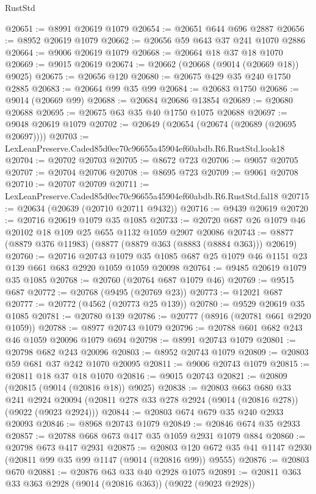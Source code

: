 \begin{lexlean}{RustStd}
\begin{coremodule}
@20651 := @8991 @20619 @1079
@20654 := @20651 @644 @696 @2887
@20656 := @8952 @20619 @1079
@20662 := @20656 @59 @643 @37 @241 @1070 @2886
@20664 := @9006 @20619 @1079
@20668 := @20664 @18 @37 @18 @1070
@20669 := @9015 @20619
@20674 := @20662 (@20668 (@9014 (@20669 @18)) @9025)
@20675 := @20656 @120
@20680 := @20675 @429 @35 @240 @1750 @2885
@20683 := @20664 @99 @35 @99
@20684 := @20683 @1750
@20686 := @9014 (@20669 @99)
@20688 := @20684 @20686 @13854
@20689 := @20680 @20688
@20695 := @20675 @63 @35 @40 @1750 @1075 @20688
@20697 := @9048 @20619 @1079
@20702 := @20649 (@20654 (@20674 (@20689 (@20695 @20697))))
@20703 := LexLeanPreserve.Caded85d0ec70c96655a45904ef60abdb.R6.RustStd.look18
@20704 := @20702 @20703
@20705 := @8672 @723
@20706 := @9057 @20705
@20707 := @20704 @20706
@20708 := @8695 @723
@20709 := @9061 @20708
@20710 := @20707 @20709
@20711 := LexLeanPreserve.Caded85d0ec70c96655a45904ef60abdb.R6.RustStd.fal18
@20715 := @20634 (@20639 (@20710 @20711 @9432))
@20716 := @9439 @20619
@20720 := @20716 @20619 @1079 @35 @1085
@20733 := @20720 @687 @26 @1079 @46 @20102 @18 @109 @25 @655 @1132 @1059 @2907 @20086
@20743 := @8877 (@8879 @376 @11983) (@8877 (@8879 @363 (@8883 (@8884 @363))) @20619)
@20760 := @20716
    @20743
    @1079
    @35
    @1085
    @687
    @25
    @1079
    @46
    @1151
    @23
    @139
    @661
    @683
    @2920
    @1059
    @1059
    @20098
@20764 := @9485 @20619 @1079 @35 @1085
@20768 := @20760 (@20764 @687 @1079 @46)
@20769 := @9515 @687
@20772 := @20768 (@9495 (@20769 @23))
@20773 := @12021 @687
@20777 := @20772 (@4562 (@20773 @25 @139))
@20780 := @9529 @20619 @35 @1085
@20781 := @20780 @139
@20786 := @20777 (@8916 (@20781 @661 @2920 @1059))
@20788 := @8977 @20743 @1079
@20796 := @20788 @601 @682 @243 @46 @1059 @20096 @1079 @694
@20798 := @8991 @20743 @1079
@20801 := @20798 @682 @243 @20096
@20803 := @8952 @20743 @1079
@20809 := @20803 @59 @681 @37 @242 @1070 @20095
@20811 := @9006 @20743 @1079
@20815 := @20811 @18 @37 @18 @1070
@20816 := @9015 @20743
@20821 := @20809 (@20815 (@9014 (@20816 @18)) @9025)
@20838 := @20803
    @663
    @680
    @33
    @241
    @2924
    @20094
    (@20811 @278 @33 @278 @2924 (@9014 (@20816 @278)) (@9022 (@9023 @2924)))
@20844 := @20803 @674 @679 @35 @240 @2933 @20093
@20846 := @8968 @20743 @1079
@20849 := @20846 @674 @35 @2933
@20857 := @20788 @668 @673 @417 @35 @1059 @2931 @1079 @884
@20860 := @20798 @673 @417 @2931
@20875 := @20803 @120 @672 @35 @41 @1147 @2930 (@20811 @99 @35 @99 @1147 (@9014 (@20816 @99)) @9555)
@20876 := @20803 @670
@20881 := @20876 @63 @33 @40 @2928 @1075
@20891 := @20811 @363 @33 @363 @2928 (@9014 (@20816 @363)) (@9022 (@9023 @2928))

\end{coremodule}
\end{lexlean}
